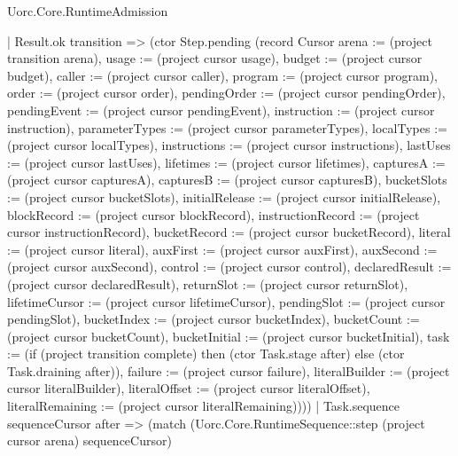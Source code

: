 \begin{lexlean}{Uorc.Core.RuntimeAdmission}
\begin{semanticmodule}
{      | Result.ok transition => (ctor Step.pending (record Cursor {arena := (project transition arena), usage := (project cursor usage), budget := (project cursor budget), caller := (project cursor caller), program := (project cursor program), order := (project cursor order), pendingOrder := (project cursor pendingOrder), pendingEvent := (project cursor pendingEvent), instruction := (project cursor instruction), parameterTypes := (project cursor parameterTypes), localTypes := (project cursor localTypes), instructions := (project cursor instructions), lastUses := (project cursor lastUses), lifetimes := (project cursor lifetimes), capturesA := (project cursor capturesA), capturesB := (project cursor capturesB), bucketSlots := (project cursor bucketSlots), initialRelease := (project cursor initialRelease), blockRecord := (project cursor blockRecord), instructionRecord := (project cursor instructionRecord), bucketRecord := (project cursor bucketRecord), literal := (project cursor literal), auxFirst := (project cursor auxFirst), auxSecond := (project cursor auxSecond), control := (project cursor control), declaredResult := (project cursor declaredResult), returnSlot := (project cursor returnSlot), lifetimeCursor := (project cursor lifetimeCursor), pendingSlot := (project cursor pendingSlot), bucketIndex := (project cursor bucketIndex), bucketCount := (project cursor bucketCount), bucketInitial := (project cursor bucketInitial), task := (if (project transition complete) then (ctor Task.stage after) else (ctor Task.draining after)), failure := (project cursor failure), literalBuilder := (project cursor literalBuilder), literalOffset := (project cursor literalOffset), literalRemaining := (project cursor literalRemaining)})))
    | Task.sequence sequenceCursor after => (match (Uorc.Core.RuntimeSequence::step (project cursor arena) sequenceCursor)
}
\end{semanticmodule}
\end{lexlean}
